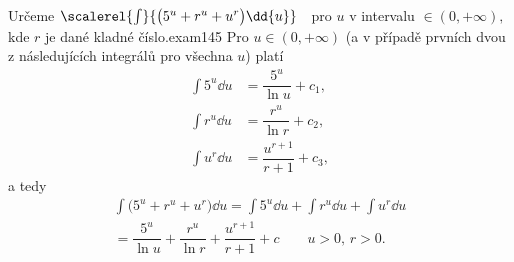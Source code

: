 \begin{mathexam}{Určeme \(\scalerel{\int}{\bigl(5^u + r^u + u^r\bigr)\dd{u}}\quad\)pro \(u\) v
  intervalu \(\in(0, +\infty),\) kde \(r\) je dané kladné číslo.}{exam145}
    Pro \(u\in(0, +\infty)\) (a v případě prvních dvou z následujících integrálů pro všechna \(u\))
    platí
    \begin{align*}
      \int 5^u\dd{u}  &= \dfrac{5^u}{\ln u}   + c_1,  \\
      \int r^u\dd{u}  &= \dfrac{r^u}{\ln r}   + c_2,  \\
      \int u^r\dd{u}  &= \dfrac{u^{r+1}}{r+1} + c_3,
    \end{align*}  
    a tedy
    \begin{multline*}
      \int\bigl(5^u + r^u + u^r\bigr)\dd{u} = \int 5^u\dd{u}+\int r^u\dd{u}+\int u^r\dd{u}        \\
          =\dfrac{5^u}{\ln u} + \dfrac{r^u}{\ln r} + \dfrac{u^{r+1}}{r+1} + c\qquad u>0, \, r>0. 
    \end{multline*}
\end{mathexam}
